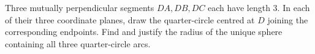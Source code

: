 Three mutually perpendicular segments $DA,DB,DC$ each have length 3. In each of their three coordinate planes, draw the quarter-circle centred at $D$ joining the corresponding endpoints. Find and justify the radius of the unique sphere containing all three quarter-circle arcs.
